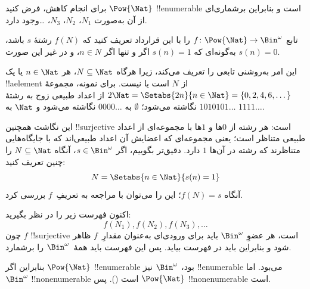  {
  برای انجام کاهش، فرض کنید $\Pow{\Nat}$ !!{enumerable} است و بنابراین
  برشماری‌ای از آن به‌صورت $N_{1}$، $N_{2}$، $N_{3}$، \dots وجود دارد.

  تابع $f \colon \Pow{\Nat} \to \Bin^\omega$ را با این قرارداد تعریف
  کنید که $f(N)$ رشتهٔ $s$ باشد، به‌گونه‌ای که $s(n) = 1$ اگر و تنها
  اگر $n \in N$، و در غیر این صورت $s(n) = 0$.

  این امر به‌روشنی تابعی را تعریف می‌کند، زیرا هرگاه $N \subseteq \Nat$،
  هر $n \in \Nat$ یا یک !!a{element} از $N$ است یا نیست. برای نمونه،
  مجموعهٔ $2\Nat = \Setabs{2n}{n \in \Nat} = \{0,2, 4, 6,
  \dots\}$ از اعداد طبیعی زوج به رشتهٔ $1010101\dots$ نگاشته می‌شود؛
  $\emptyset$ به $0000\dots$ نگاشته می‌شود و $\Nat$ به
  $1111\dots$.

  این نگاشت همچنین !!{surjective} است: هر رشته از $0$ها و $1$ها با
  مجموعه‌ای از اعداد طبیعی متناظر است؛ یعنی مجموعه‌ای که اعضایش آن اعداد
  طبیعی‌اند که با جایگاه‌هایی متناظرند که رشته در آن‌ها $1$ دارد. دقیق‌تر
  بگوییم، اگر $s \in \Bin^\omega$، آنگاه $N
  \subseteq \Nat$ را چنین تعریف کنید:
  \[
  N = \Setabs{n \in \Nat}{s(n) = 1}
  \]
  آنگاه $f(N) = s$؛ این را می‌توان با مراجعه به تعریفِ~$f$ بررسی کرد.

  اکنون فهرست زیر را در نظر بگیرید:
  \[
  f(N_1), f(N_2), f(N_3), \dots
  \]
  چون $f$ !!{surjective} است، هر عضوِ $\Bin^\omega$ باید برای ورودی‌ای
  به‌عنوان مقدارِ~$f$ ظاهر شود و بنابراین باید در فهرست بیاید. پس این
  فهرست باید همهٔ~$\Bin^\omega$ را برشمارد.

  بنابراین اگر $\Pow{\Nat}$ !!{enumerable} بود، $\Bin^\omega$ نیز
  !!{enumerable} می‌بود. اما $\Bin^\omega$ !!{nonenumerable} است
  (). پس $\Pow{\Nat}$
  !!{nonenumerable} است.
 }



